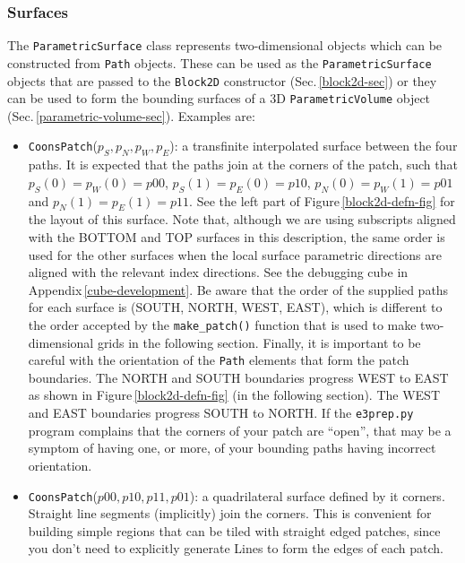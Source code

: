 \subsubsection{Surfaces}
\label{parametric-surface-sec}
%
The \texttt{ParametricSurface} class 
represents two-dimensional objects which can be constructed from \texttt{Path} objects.
These can be used as the \verb!ParametricSurface! objects that are passed to the \verb!Block2D! constructor
(Sec.\,\ref{block2d-sec}) or they can be used to form the bounding surfaces of a 3D \verb!ParametricVolume! object
(Sec.\,\ref{parametric-volume-sec}).
Examples are:
\begin{itemize}
\item \texttt{CoonsPatch}($p_S, p_N, p_W, p_E$): a transfinite interpolated
  surface between the four paths.
  It is expected that the paths join at the corners of the patch, such that
  $p_S(0) = p_W(0) = p00$, $p_S(1) = p_E(0) = p10$, $p_N(0) = p_W(1) = p01$ and $p_N(1) =  p_E(1) = p11$.
  See the left part of Figure\,\ref{block2d-defn-fig} for the layout of this surface.
  Note that, although we are using subscripts aligned with the BOTTOM and TOP
  surfaces in this description, the same order is used for the other surfaces
  when the local surface parametric directions are aligned with the relevant index
  directions.
  See the debugging cube in Appendix\,\ref{cube-development}.
  Be aware that the order of the supplied paths for each surface is (SOUTH, NORTH, WEST, EAST),
  which is different to the order accepted by the \texttt{make\_patch()} function 
  that is used to make two-dimensional grids in the following section.  
  Finally, it is important to be careful with the orientation of the \texttt{Path}
  elements that form the patch boundaries.
  The NORTH and SOUTH boundaries progress WEST to EAST as shown in Figure\,\ref{block2d-defn-fig}
  (in the following section).
  The WEST and EAST boundaries progress SOUTH to NORTH.
  If the \texttt{e3prep.py} program complains that the corners of your patch are ``open'',
  that may be a symptom of having one, or more, of your bounding paths having incorrect orientation.
\item \texttt{CoonsPatch}($p00, p10, p11, p01$): a quadrilateral surface defined by it corners.
  Straight line segments (implicitly) join the corners.
  This is convenient for building simple regions that can be tiled with straight edged patches,
  since you don't need to explicitly generate Lines to form the edges of each patch.

\end{itemize}
